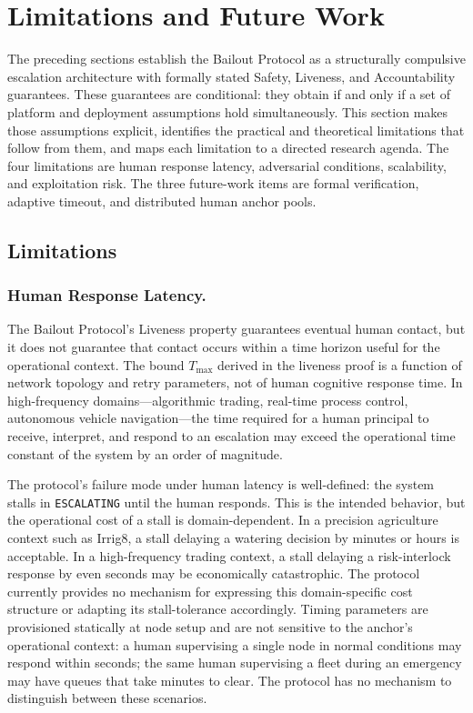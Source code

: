 \section{Limitations and Future Work}\label{sec:limitations}

The preceding sections establish the Bailout Protocol as a structurally compulsive escalation architecture with formally stated Safety, Liveness, and Accountability guarantees. These guarantees are conditional: they obtain if and only if a set of platform and deployment assumptions hold simultaneously. This section makes those assumptions explicit, identifies the practical and theoretical limitations that follow from them, and maps each limitation to a directed research agenda. The four limitations are human response latency, adversarial conditions, scalability, and exploitation risk. The three future-work items are formal verification, adaptive timeout, and distributed human anchor pools.

\subsection{Limitations}

\subsubsection{Human Response Latency.}

The Bailout Protocol's Liveness property guarantees eventual human contact, but it does not guarantee that contact occurs within a time horizon useful for the operational context. The bound $T_{\max}$ derived in the liveness proof is a function of network topology and retry parameters, not of human cognitive response time. In high-frequency domains---algorithmic trading, real-time process control, autonomous vehicle navigation---the time required for a human principal to receive, interpret, and respond to an escalation may exceed the operational time constant of the system by an order of magnitude.

The protocol's failure mode under human latency is well-defined: the system stalls in \texttt{ESCALATING} until the human responds. This is the intended behavior, but the operational cost of a stall is domain-dependent. In a precision agriculture context such as Irrig8, a stall delaying a watering decision by minutes or hours is acceptable. In a high-frequency trading context, a stall delaying a risk-interlock response by even seconds may be economically catastrophic. The protocol currently provides no mechanism for expressing this domain-specific cost structure or adapting its stall-tolerance accordingly. Timing parameters are provisioned statically at node setup and are not sensitive to the anchor's operational context: a human supervising a single node in normal conditions may respond within seconds; the same human supervising a fleet during an emergency may have queues that take minutes to clear. The protocol has no mechanism to distinguish between these scenarios.

